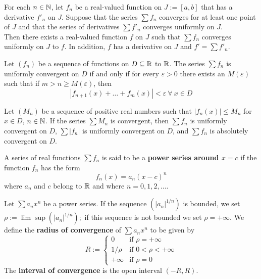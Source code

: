 \begin{theorem}
	For each $n \in \mathbb{N}$, let $f_n$ be a real-valued function on $J:=[a,b]$ that has a derivative $f'_n$ on $J$. Suppose that the series $\sum f_n$ converges for at least one point of $J$ and that the series of derivatives $\sum f'_n$ converges uniformly on $J$.
	\\Then there exists a real-valued function $f$ on $J$ such that $\sum f_n$ converges uniformly on $J$ to $f$. In addition, $f$ has a derivative on $J$ and $f'=\sum f'_n$.
\end{theorem}

\begin{theorem}
	Let $(f_n)$ be a sequence of functions on $D\subseteq \mathbb{R}$ to $\mathbb{R}$. The series $\sum f_n$ is uniformly convergent on $D$ if and only if for every $\varepsilon >0$ there exists an $M(\varepsilon)$ such that if $m>n\geq M(\varepsilon)$, then
	\[|f_{n+1}(x)+\dots+f_m(x)|<\varepsilon\ \forall\ x \in D\]
\end{theorem}

\begin{theorem}
	Let $(M_n)$ be a sequence of positive real numbers such that $|f_n(x)|\leq M_n$ for $x \in D$, $n \in \mathbb{N}$. If the series $\sum M_n$ is convergent, then $\sum f_n$ is uniformly convergent on $D$, $\sum |f_n|$ is uniformly convergent on $D$, and $\sum f_n$ is absolutely convergent on $D$.
\end{theorem}

\begin{definition}
	A series of real functions $\sum f_n$ is said to be a \textbf{power series around $x=c$} if the function $f_n$ has the form
	\[f_n(x)=a_n(x-c)^n\]
	where $a_n$ and $c$ belong to $\mathbb{R}$ and where $n=0,1,2,\dots$.
\end{definition}

\begin{definition}
	Let $\sum a_nx^n$ be a power series. If the sequence $(|a_n|^{1/n})$ is bounded, we set $\rho := \lim\sup(|a_n|^{1/n});$ if this sequence is not bounded we set $\rho=+\infty$. We define the \textbf{radius of convergence} of $\sum a_nx^n$ to be given by
	\[R:=\begin{cases}
			0       & \text{if } \rho = +\infty \\
			1/\rho  & \text{if } 0<\rho<+\infty \\
			+\infty & \text{if } \rho=0
		\end{cases}\]
	The \textbf{interval of convergence} is the open interval $(-R, R)$.
\end{definition}

